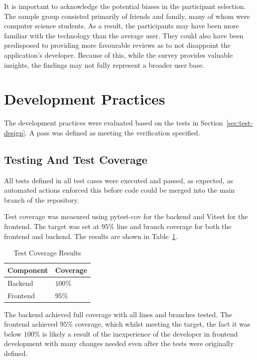 It is important to acknowledge the potential biases in the participant selection. The sample group consisted primarily of friends and family, many of whom were computer science students. As a result, the participants may have been more familiar with the technology than the average user. They could also have been predisposed to providing more favourable reviews as to not disappoint the application's developer. Because of this, while the survey provides valuable insights, the findings may not fully represent a broader user base.

\section{Development Practices}
The development practices were evaluated based on the tests in Section~\ref{sec:test-design}. A pass was defined as meeting the verification specified.

\subsection{Testing And Test Coverage}
All tests defined in all test cases were executed and passed, as expected, as automated actions enforced this before code could be merged into the main branch of the repository.

Test coverage was measured using pytest-cov for the backend and Vitest for the frontend. The target was set at $95\%$ line and branch coverage for both the frontend and backend. The results are shown in Table~\ref{tab:test-coverage-results}.
\begin{table} [H]
    \centering
    \begin{tabular}{|m{3cm}|m{3cm}|}
        \hline
        \textbf{Component} & \textbf{Coverage} \\
        \hline
        Backend & $100\%$ \\
        \hline
        Frontend & $95\%$ \\
        \hline
    \end{tabular}
    \caption{Test Coverage Results}
    \label{tab:test-coverage-results}
\end{table}

The backend achieved full coverage with all lines and branches tested. The frontend achieved $95\%$ coverage, which whilst meeting the target, the fact it was below $100\%$ is likely a result of the inexperience of the developer in frontend development with many changes needed even after the tests were originally defined.

